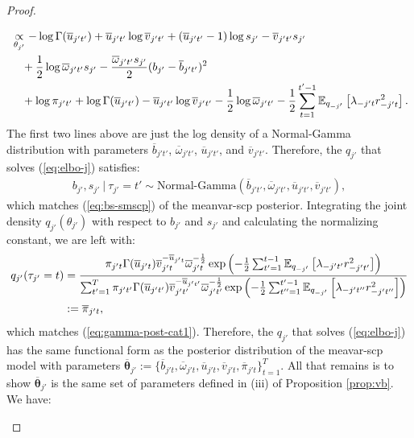 \begin{proof}
\begin{enumerate}[label=\roman*.]
\begin{align*}
    &\underset{\theta_{j'}}{\propto} -\log\Gamma(\overline{u}_{j't'}) + \overline{u}_{j't'} \log \overline{v}_{j't'}  + \left(\overline{u}_{j't'} -1\right)\log s_{j'}  - \overline{v}_{j't'} s_{j'} \\
    &\quad + \frac{1}{2}\log \overline{\omega}_{j't'}s_{j'} - \frac{\overline{\omega}_{j't'} s_{j'}}{2} (b_{j'} - \overline{b}_{j't'} )^2 \\
    &\quad + \log \pi_{j't'} + \log\Gamma(\overline{u}_{j't'}) - \overline{u}_{j't'} \log \overline{v}_{j't'} - \frac{1}{2}\log \overline{\omega}_{j't'} -\frac{1}{2} \sum_{t=1}^{t'-1} \mathbb{E}_{q_{-j'}}\left[\lambda_{-j't}r_{-j't}^2\right]. 
\end{align*}
The first two lines above are just the log density of a Normal-Gamma distribution with parameters $\overline{b}_{j't'} $, $\overline{\omega}_{j't'}$, $\overline{u}_{j't'}$, and $\overline{v}_{j't'}$. Therefore, the $q_{j'}$ that solves (\ref{eq:elbo-j}) satisfies:
\begin{align*}
    b_{j'}, s_{j'} \:|\: \tau_{j'} = t' \sim \text{Normal-Gamma}(\overline{b}_{j't'} , \overline{\omega}_{j't'}, \overline{u}_{j't'}, \overline{v}_{j't'}),
\end{align*}
which matches (\ref{eq:bs-smscp}) of the meanvar-scp posterior. Integrating the joint density $q_{j'}(\theta_{j'})$ with respect to $b_{j'}$ and $s_{j'}$ and calculating the normalizing constant, we are left with:
\begin{align*}
    q_{j'}(\tau_{j'} = t) &= \frac{\pi_{j't}\Gamma(\overline{u}_{j't})\overline{v}_{j't}^{-\overline{u}_{j't}}\overline{\omega}_{j't}^{-\frac{1}{2}}\exp\left( -\frac{1}{2} \sum_{t'=1}^{t-1} \mathbb{E}_{q_{-j'}}\left[\lambda_{-j't'}r_{-j't'}^2\right] \right)}{\sum_{t'=1}^T \pi_{j't'}\Gamma(\overline{u}_{j't'})\overline{v}_{j't'}^{-\overline{u}_{j't'}}\overline{\omega}_{j't'}^{-\frac{1}{2}}\exp\left( -\frac{1}{2} \sum_{t''=1}^{t'-1} \mathbb{E}_{q_{-j'}}\left[\lambda_{-j't''}r_{-j't''}^2\right] \right)} \\
    &:= \overline{\pi}_{j't}, 
\end{align*}
which matches (\ref{eq:gamma-post-cat1}). Therefore, the $q_{j'}$ that solves (\ref{eq:elbo-j}) has the same functional form as the posterior distribution of the meavar-scp model with parameters $\overline{\boldsymbol{\theta}}_{j'} := \{\overline{b}_{j't}, \overline{\omega}_{j't},\overline{u}_{j't},\overline{v}_{j't},\overline{\pi}_{j't}\}_{t=1}^T$. All that remains is to show $\overline{\boldsymbol{\theta}}_{j'}$ is the same set of parameters defined in (iii) of Proposition \ref{prop:vb}. We have:

\end{enumerate}
\end{proof}
